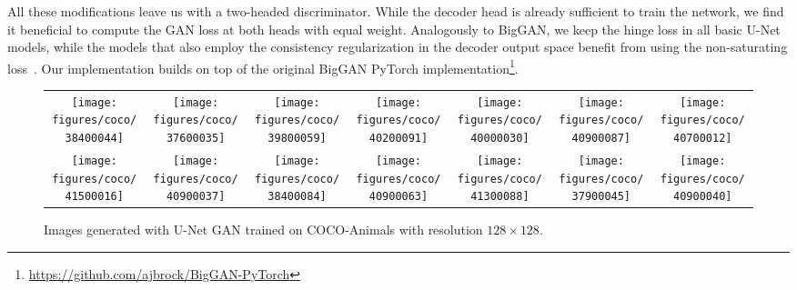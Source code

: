 \documentclass[10pt,twocolumn,letterpaper]{article}
\begin{document}
All these modifications leave us with a two-headed discriminator.
While the decoder head is already sufficient to train the network, we find it beneficial to compute the GAN loss at both heads with equal weight. Analogously to BigGAN, we keep the hinge loss \cite{Zhang_SAGAN19} in all basic U-Net models, while the models that also employ the consistency regularization in the decoder output space benefit from using the non-saturating loss~\cite{goodfellow2014generative}.
Our implementation builds on top of the original BigGAN PyTorch implementation\footnote{\url{https://github.com/ajbrock/BigGAN-PyTorch}}.









\begin{figure*}[h]
\begin{centering}
\setlength{\tabcolsep}{0.0em}
\renewcommand{\arraystretch}{0}
\par\end{centering}
\begin{centering}
\vspace{-1em}
\hfill{}\begin{tabular}{@{}c@{\hskip 0.05in}c@{\hskip 0.05in}c@{\hskip 0.05in}c@{\hskip 0.05in}c@{\hskip 0.05in}c@{\hskip 0.05in}c@{}}
\texttt{[image: figures/coco/38400044]} &
\texttt{[image: figures/coco/37600035]} &
\texttt{[image: figures/coco/39800059]} &
\texttt{[image: figures/coco/40200091]} &
\texttt{[image: figures/coco/40000030]}  & \texttt{[image: figures/coco/40900087]}  &
\texttt{[image: figures/coco/40700012]} 

\tabularnewline

\texttt{[image: figures/coco/41500016]} &
\texttt{[image: figures/coco/40900037]} &
\texttt{[image: figures/coco/38400084]} &
\texttt{[image: figures/coco/40900063]}  &
\texttt{[image: figures/coco/41300088]}  &
\texttt{[image: figures/coco/37900045]}  &
\texttt{[image: figures/coco/40900040]}
\tabularnewline






\end{tabular}\hfill{}
\par\end{centering}
\vspace{-0.5em}
\caption{\label{fig:coco_pics} Images generated with U-Net GAN trained on COCO-Animals with resolution $128 \times 128$.
 }
\vspace{-0.5em}
\end{figure*}
\end{document}
